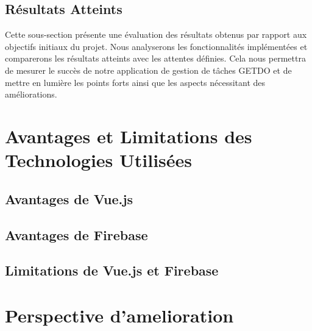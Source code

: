 \documentclass[a4paper,12pt]{report}
\begin{document}
    \subsection{Résultats Atteints}
    Cette sous-section présente une évaluation des résultats obtenus par rapport aux objectifs initiaux du projet. Nous analyserons les fonctionnalités implémentées et comparerons les résultats atteints avec les attentes définies. Cela nous permettra de mesurer le succès de notre application de gestion de tâches GETDO et de mettre en lumière les points forts ainsi que les aspects nécessitant des améliorations.
    
  \section{Avantages et Limitations des Technologies Utilisées}
    \subsection{Avantages de Vue.js}
    \subsection{Avantages de Firebase}
    \subsection{Limitations de Vue.js et Firebase}
  \section{Perspective d'amelioration}
  
\end{document}
